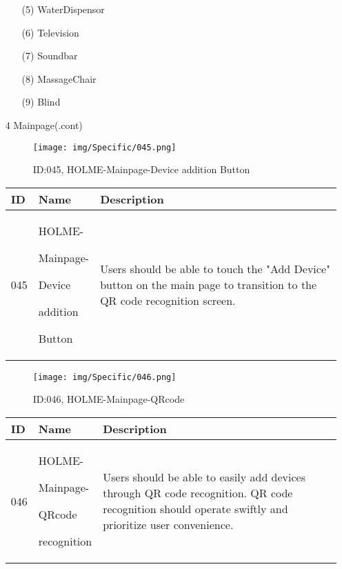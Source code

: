 \documentclass[conference]{IEEEtran}
\begin{document}
\begin{enumerate}
\begin{itemize}
\item [(5)] WaterDispensor\cite{WaterDispensor}\\
\item [(6)] Television\cite{Television}\\
\item [(7)] Soundbar\cite{Soundbar}\\
\item [(8)] MassageChair\cite{MassageChair}\\
\item [(9)] Blind\cite{Blind}\\
\end{itemize}
\clearpage

\item[4] Mainpage(.cont)\\
\begin{figure}[h]
\centering
\texttt{[image: img/Specific/045.png]}
\caption{ID:045, HOLME-Mainpage-Device addition Button}
\end{figure}
\begin{table}[h]
\def\arraystretch{1.2} \small
    \begin{tabular}{|p{1cm}|p{1.8cm}|p{5.0cm}|}
        \hline
        ID & Name & Description\\ \hline
         045 \par  & HOLME-\par Mainpage-\par Device \par addition \par Button &Users should be able to touch the "Add Device" button on the main page to transition to the QR code recognition screen.\\ \hline
    \end{tabular}
\end{table}

\vspace{1cm}

\begin{figure}[h]
\centering
\texttt{[image: img/Specific/046.png]}
\caption{ID:046, HOLME-Mainpage-QRcode}
\end{figure}
\begin{table}[h]
\def\arraystretch{1.2} \small
    \begin{tabular}{|p{1cm}|p{1.8cm}|p{5.0cm}|}
        \hline
        ID & Name & Description\\ \hline
         046 \par  & HOLME-\par Mainpage-\par QRcode \par recognition &Users should be able to easily add devices through QR code recognition. QR code recognition should operate swiftly and prioritize user convenience.\\ \hline
    \end{tabular}
\end{table}


\end{enumerate}
\end{document}
